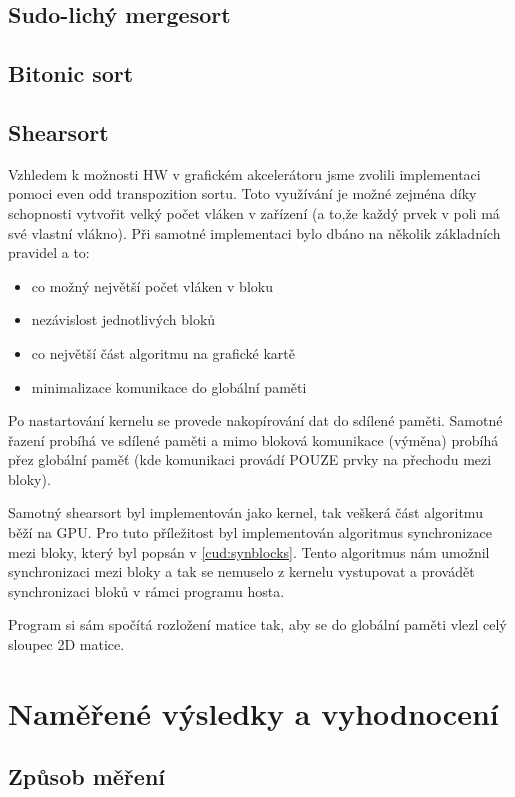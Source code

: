 \documentclass[12pt]{article}
\begin{document}
\subsection{Sudo-lichý mergesort}

\subsection{Bitonic sort}

\subsection{Shearsort}
Vzhledem k možnosti HW v grafickém akcelerátoru jsme zvolili implementaci pomoci even odd transpozition sortu. Toto využívání je možné zejména díky schopnosti vytvořit velký počet vláken v zařízení (a to,že každý prvek v poli má své vlastní vlákno). Při samotné implementaci bylo dbáno na několik základních pravidel a to:
\begin{itemize}
	\item co možný největší počet vláken v bloku
	\item nezávislost jednotlivých bloků
	\item co největší část algoritmu na grafické kartě
	\item minimalizace komunikace do globální paměti
\end{itemize}

Po nastartování kernelu se provede nakopírování dat do sdílené paměti. Samotné řazení probíhá ve sdílené paměti a mimo bloková komunikace (výměna) probíhá přez globální paměť (kde komunikaci provádí POUZE prvky na přechodu mezi bloky). 

Samotný shearsort byl implementován jako kernel, tak veškerá část algoritmu běží na GPU. Pro tuto příležitost byl implementován algoritmus synchronizace mezi bloky, který byl popsán v \ref{cud:synblocks}. Tento algoritmus nám umožnil synchronizaci mezi bloky a tak se nemuselo z kernelu vystupovat a provádět synchronizaci bloků v rámci programu hosta.

Program si sám spočítá rozložení matice tak, aby se do globální paměti vlezl celý sloupec 2D matice.


\section{Naměřené výsledky a vyhodnocení}
\subsection{Způsob měření}
\end{document}
